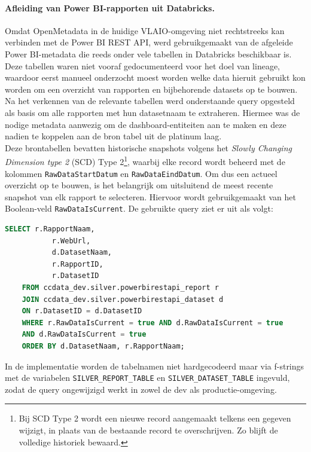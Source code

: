 \paragraph{Afleiding van Power BI-rapporten uit Databricks.}

Omdat OpenMetadata in de huidige VLAIO-omgeving niet rechtstreeks kan verbinden met de Power BI REST API, werd gebruikgemaakt van de afgeleide Power BI-metadata die reeds onder vele tabellen in Databricks beschikbaar is. Deze tabellen waren niet vooraf gedocumenteerd voor het doel van lineage, waardoor eerst manueel onderzocht moest worden welke data hieruit gebruikt kon worden om een overzicht van rapporten en bijbehorende datasets op te bouwen. Na het verkennen van de relevante tabellen werd onderstaande query opgesteld als basis om alle rapporten met hun datasetnaam te extraheren. Hiermee was de nodige metadata aanwezig om de dash\-board-en\-ti\-tei\-ten aan te maken en deze nadien te koppelen aan de bron tabel uit de platinum laag.\\

Deze brontabellen bevatten historische snapshots volgens het \textit{Slowly Changing Dimension type 2} (SCD) Type 2\footnote{Bij SCD Type 2 wordt een nieuwe record aangemaakt telkens een gegeven wijzigt, in plaats van de bestaande record te overschrijven. Zo blijft de volledige historiek bewaard.}, waarbij elke record wordt beheerd met de kolommen \texttt{RawDataStartDatum} en \texttt{RawDataEindDatum}. Om dus een actueel overzicht op te bouwen, is het belangrijk om uitsluitend de meest recente snapshot van elk rapport te selecteren. Hiervoor wordt gebruikgemaakt van het Boolean-veld \texttt{RawDataIsCurrent}. De gebruikte query ziet er uit als volgt:

\begin{lstlisting}[language=SQL, caption={Query om de meest recente Power BI-metadata te selecteren}, label={lst:powerbirest-query}]
	SELECT r.RapportNaam, 
		   r.WebUrl, 
		   d.DatasetNaam, 
		   r.RapportID, 
		   r.DatasetID
	FROM ccdata_dev.silver.powerbirestapi_report r
	JOIN ccdata_dev.silver.powerbirestapi_dataset d
	ON r.DatasetID = d.DatasetID
	WHERE r.RawDataIsCurrent = true AND d.RawDataIsCurrent = true
	AND d.RawDataIsCurrent = true
	ORDER BY d.DatasetNaam, r.RapportNaam;
\end{lstlisting}

In de implementatie worden de tabelnamen niet hardgecodeerd maar via f-strings met de variabelen \texttt{SILVER\_REPORT\_TABLE} en \texttt{SILVER\_DATASET\_TABLE} ingevuld, zodat de query ongewijzigd werkt in zowel de dev als productie-omgeving.\\

